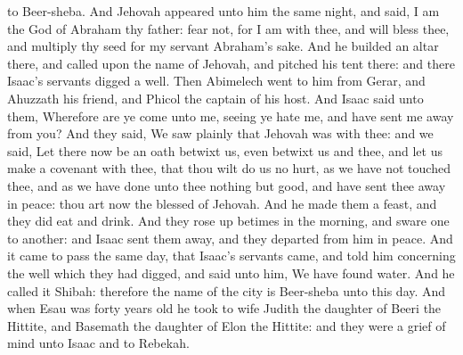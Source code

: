 to Beer-sheba. And Jehovah appeared unto him the same night, and said, I am the God of Abraham thy father: fear not, for I am with thee, and will bless thee, and multiply thy seed for my servant Abraham’s sake. And he builded an altar there, and called upon the name of Jehovah, and pitched his tent there: and there Isaac’s servants digged a well.  Then Abimelech went to him from Gerar, and Ahuzzath his friend, and Phicol the captain of his host. And Isaac said unto them, Wherefore are ye come unto me, seeing ye hate me, and have sent me away from you? And they said, We saw plainly that Jehovah was with thee: and we said, Let there now be an oath betwixt us, even betwixt us and thee, and let us make a covenant with thee, that thou wilt do us no hurt, as we have not touched thee, and as we have done unto thee nothing but good, and have sent thee away in peace: thou art now the blessed of Jehovah. And he made them a feast, and they did eat and drink. And they rose up betimes in the morning, and sware one to another: and Isaac sent them away, and they departed from him in peace. And it came to pass the same day, that Isaac’s servants came, and told him concerning the well which they had digged, and said unto him, We have found water. And he called it Shibah: therefore the name of the city is Beer-sheba unto this day.  And when Esau was forty years old he took to wife Judith the daughter of Beeri the Hittite, and Basemath the daughter of Elon the Hittite: and they were a grief of mind unto Isaac and to Rebekah. 


